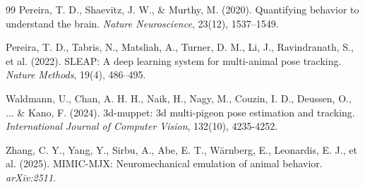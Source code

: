 \documentclass[pdflatex, sn-nature]{sn-jnl}
\theoremstyle{thmstyleone}%
\theoremstyle{thmstyletwo}%
\theoremstyle{thmstylethree}%
\begin{document}
\begin{thebibliography}{99}
 Pereira, T. D., Shaevitz, J. W., \& Murthy, M. (2020). Quantifying behavior to understand the brain. \textit{Nature Neuroscience}, 23(12), 1537--1549.

 Pereira, T. D., Tabris, N., Matsliah, A., Turner, D. M., Li, J., Ravindranath, S., et al. (2022). SLEAP: A deep learning system for multi-animal pose tracking. \textit{Nature Methods}, 19(4), 486--495.

 Waldmann, U., Chan, A. H. H., Naik, H., Nagy, M., Couzin, I. D., Deussen, O., ... \& Kano, F. (2024). 3d-muppet: 3d multi-pigeon pose estimation and tracking. \textit{International Journal of Computer Vision}, 132(10), 4235-4252.

 Zhang, C. Y., Yang, Y., Sirbu, A., Abe, E. T., Wärnberg, E., Leonardis, E. J., et al. (2025). MIMIC-MJX: Neuromechanical emulation of animal behavior. \textit{arXiv:2511}.

\end{thebibliography}
\end{document}
